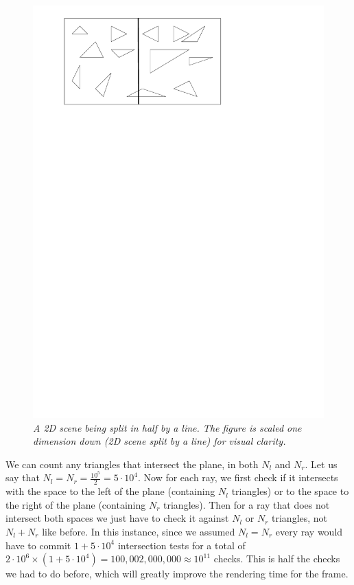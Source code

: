 \documentclass[12pt]{article}
\begin{document}
\begin{figure}[!h]
\centering
\includegraphics{figs/splittingPlane}
\caption{\textit{A 2D scene being split in half by a line. The figure is scaled one dimension down (2D scene split by a line) for visual clarity.}}
\label{figure:sp}
\end{figure}
\indent We can count any triangles that intersect the plane, in both $N_l$ and $N_r$. Let us say that $N_l=N_r=\frac{10^5}{2}=5\cdot10^4$. Now for each ray, we first check if it intersects with the space to the left of the plane (containing $N_l$ triangles) or to the space to the right of the plane (containing $N_r$ triangles). Then for a ray that does not intersect both spaces we just have to check it against $N_l$ or $N_r$ triangles, not $N_l + N_r$ like before. In this instance, since we assumed $N_l=N_r$ every ray would have to commit $1 + 5\cdot10^4$ intersection tests for a total of $2\cdot10^6\times(1 + 5\cdot10^4)=100,002,000,000\approx10^{11}$ checks. This is half the checks we had to do before, which will greatly improve the rendering time for the frame. 
\end{document}
